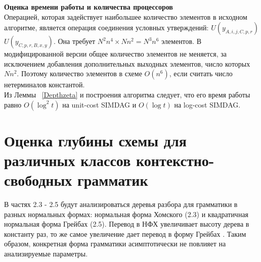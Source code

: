 \documentclass{spbau-diploma}
\begin{document}
\textbf {Оценка  времени работы и количества процессоров}
\\Операцией, которая задействует наибольшее количество элементов в исходном алгоритме, является операция соединения условных утверждений: \textit{$U(y_{A,i,j,C,p,r})$} \text{$ \land $} \textit{$U(y_{C,p,r,B,x,y})$}. Она требует $N^2n^4 \times Nn^2 = N^3n^6$ элементов. В модифицированной версии общее количество элементов не меняется, за исключением добавления дополнительных выходных элементов, число которых $Nn^2$. Поэтому количество элементов в схеме $O(n^6)$, если считать число нетерминалов константой. 
\\Из Леммы ~\ref{Depthzeta} и построения алгоритма следует, что его время работы равно $O(\log^2t)$ на unit-cost SIMDAG и $O(\log t)$ на log-cost SIMDAG.

\section {Оценка глубины схемы для различных классов контекстно-свободных грамматик}В частях 2.3 - 2.5 будут анализироваться деревья разбора для грамматики в разных нормальных формах: нормальная форма Хомского (2.3) и квадратичная нормальная форма Грейбах (2.5). Перевод в НФХ увеличивает высоту дерева в константу раз, то же самое увеличение дает перевод в форму Грейбах \cite{Kelemenova}. Таким образом, конкретная форма грамматики асимптотически не повлияет на анализируемые параметры.
\end{document}
